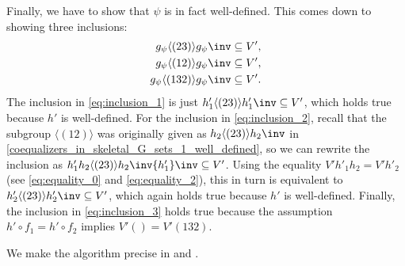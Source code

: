 \begin{exmp}
Finally, we have to show that $\psi$ is in fact well-defined. This comes down to showing three inclusions:
\begin{align}
g_\psi \langle (23) \rangle g_\psi\inv &\subseteq V',\label{eq:inclusion_1}\\
g_\psi \langle (12) \rangle g_\psi\inv &\subseteq V',\label{eq:inclusion_2}\\
g_\psi \langle (132) \rangle g_\psi\inv &\subseteq V'.\label{eq:inclusion_3}
\end{align}
The inclusion in \eqref{eq:inclusion_1} is just $h'_1 \langle (23) \rangle {h'_1}\inv \subseteq V'$, which holds true because $h'$ is well-defined. For the inclusion in \eqref{eq:inclusion_2}, recall that the subgroup $\langle (12) \rangle$ was originally given as $h_2 \langle (23) \rangle h_2\inv$ in \eqref{coequalizers_in_skeletal_G_sets_1_well_defined}, so we can rewrite the inclusion as $h'_1 h_2 \langle (23) \rangle h_2\inv {h'_1}\inv \subseteq V'$. Using the equality $V'h'_1h_2 = V'h'_2$ (see \eqref{eq:equality_0} and \eqref{eq:equality_2}), this in turn is equivalent to $h'_2 \langle (23) \rangle {h'_2}\inv \subseteq V'$, which again holds true because $h'$ is well-defined. Finally, the inclusion in \eqref{eq:inclusion_3} holds true because the assumption $h' \circ f_1 = h' \circ f_2$ implies $V'() = V'(132)$.

We make the algorithm precise in  and .
\end{exmp}

